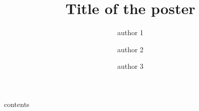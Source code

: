 \documentclass{beamer}
\title{Title of the poster}
\author{\textcolor{dgreen}{author 1}\inst{1} \and author 2\inst{1} \and author 3\inst{2} }
\institute{\inst{1} Institution 1  \and %
            \inst{2} Institution 2 }
\date{}
\begin{document}
\begin{frame}

contents

\end{frame}
\end{document}
